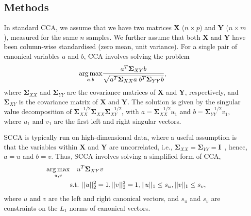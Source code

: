 \documentclass{bioinfo}
\DeclareMathOperator*{\argmax}{arg\,max}
\newcommand{\s}{\mathbf{\Sigma}}
\begin{document}
\vspace*{-12pt}
\begin{methods}
\section{Methods}

In standard CCA, we assume that we have two matrices $\mathbf{X}$ ($n \times p$)
and $\mathbf{Y}$ ($n \times m$), measured for the same $n$ samples.
We further assume that both $\mathbf{X}$ and $\mathbf{Y}$ have been
column-wise standardised (zero mean, unit variance).  For a single pair of 
canonical variables $a$ and $b$, CCA involves solving the problem
\vspace*{-10pt}
\begin{align}
\argmax_{a,b} & \frac{a^T \s_{XY} b}{
   \sqrt{a^T \s_{XX} a \; b^T \s_{YY} b}},
\label{eqn:cca}
\vspace*{-10pt}
\end{align}
where $\s_{XX}$ and $\s_{YY}$ are the covariance matrices of
$\mathbf{X}$ and $\mathbf{Y}$, respectively, and $\s_{XY}$ is the
covariance matrix of $\mathbf{X}$ and $\mathbf{Y}$. The solution is given by
the singular value decomposition of $\s_{XX}^{-1/2} \s_{XX}
\s_{XY}^{-1/2}$, with $a = \s_{XX}^{-1/2} u_1$ and $b =
\s_{YY}^{-1/2} v_1$, where $u_1$ and $v_1$ are the first left and right
singular vectors.

SCCA is typically run on high-dimensional data, where a useful assumption is that
the variables within $\mathbf{X}$ and $\mathbf{Y}$ are uncorrelated,
i.e., $\s_{XX}=\s_{YY}=\mathbf{I}$~\citep{Parkhomenko2009},
hence, $a = u$ and $b = v$. Thus, SCCA involves solving a simplified form of CCA,
\begin{align}
\argmax_{u,v} &  \quad u^T \s_{XY} v \notag \\
 & \mbox{s.t. } ||u||_2^2=1, ||v||_2^2 = 1, ||u||_1 \le s_u, ||v||_1 \le s_v,
\label{eqn:scca}\vspace*{-10pt}
\end{align}
where $u$ and $v$ are the left and right canonical vectors, 
and $s_u$ and $s_v$ are constraints on the $L_1$ norms
of canonical vectors.


\end{methods}
\end{document}
